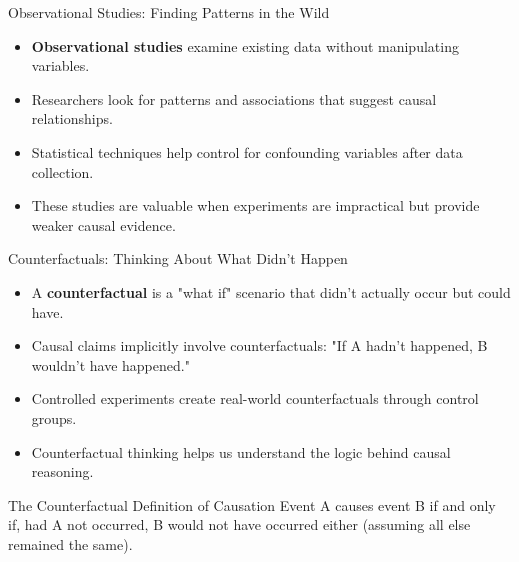\documentclass{beamer}
\begin{document}
\begin{frame}{Observational Studies: Finding Patterns in the Wild}
    \begin{itemize}
        \item \textbf{Observational studies} examine existing data without manipulating variables.
        \item Researchers look for patterns and associations that suggest causal relationships.
        \item Statistical techniques help control for confounding variables after data collection.
        \item These studies are valuable when experiments are impractical but provide weaker causal evidence.
    \end{itemize}
    
    \begin{center}
    \end{center}
\end{frame}

\begin{frame}{Counterfactuals: Thinking About What Didn't Happen}
    \begin{itemize}
        \item A \textbf{counterfactual} is a "what if" scenario that didn't actually occur but could have.
        \item Causal claims implicitly involve counterfactuals: "If A hadn't happened, B wouldn't have happened."
        \item Controlled experiments create real-world counterfactuals through control groups.
        \item Counterfactual thinking helps us understand the logic behind causal reasoning.
    \end{itemize}
    
    \begin{block}{The Counterfactual Definition of Causation}
        Event A causes event B if and only if, had A not occurred, B would not have occurred either (assuming all else remained the same).
    \end{block}
\end{frame}
\end{document}

